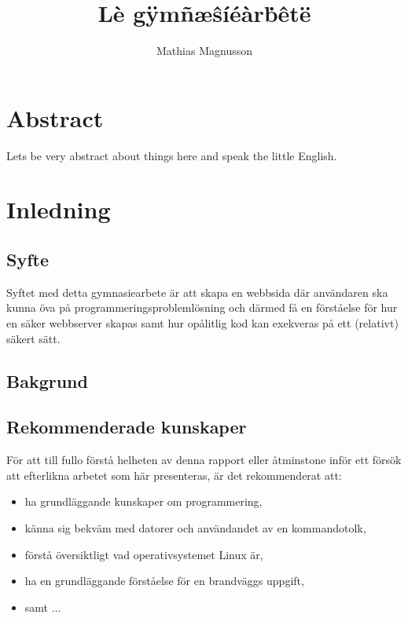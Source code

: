 \documentclass{article}
\author{Mathias Magnusson}
\title{Lè gÿmñæŝíéàrḃêtë}
\date{}
\begin{document}
\maketitle{}

\section*{Abstract}

Lets be very abstract about things here and speak the little English.

\clearpage

\tableofcontents

\clearpage

\section{Inledning}

\subsection{Syfte}

Syftet med detta gymnasiearbete är att skapa en webbsida där användaren ska
kunna öva på programmeringsproblemlösning och därmed få en förståelse för hur
en säker webbserver skapas samt hur opålitlig kod kan exekveras på ett
(relativt) säkert sätt.

\subsection{Bakgrund}

\subsection{Rekommenderade kunskaper}

För att till fullo förstå helheten av denna rapport eller åtminstone inför ett
försök att efterlikna arbetet som här presenteras, är det rekommenderat att:

\begin{itemize}
	\item ha grundläggande kunskaper om programmering,
	\item känna sig bekväm med datorer och användandet av en kommandotolk,
	\item förstå översiktligt vad operativsystemet Linux är,
	\item ha en grundläggande förståelse för en brandväggs uppgift,
	\item samt ...
\end{itemize}
\end{document}
